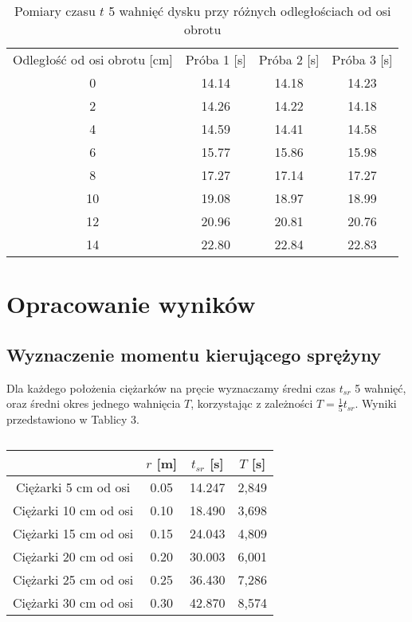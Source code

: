 \documentclass[10pt,a4paper]{article}
\newcommand{\forceindent}{\leavevmode{\parindent=3em\indent}}
\begin{document}
\begin{table}[!h]
\centering
\begin{tabular}{|c||c|c|c|}
\hline
Odległość od osi obrotu [cm]& Próba 1 [s] & Próba 2 [s] & Próba 3 [s] \\
\hhline{|=||=|=|=|}
0 & 14.14 & 14.18 & 14.23 \\
2 & 14.26 & 14.22 & 14.18 \\ 
4 & 14.59 & 14.41 & 14.58 \\
6 & 15.77 & 15.86 & 15.98 \\
8 & 17.27 & 17.14 & 17.27 \\
10 & 19.08 & 18.97 & 18.99 \\
12 & 20.96 & 20.81 & 20.76 \\
14 & 22.80 & 22.84 & 22.83 \\
\hline

\end{tabular}
\caption{Pomiary czasu $t$ 5 wahnięć dysku przy różnych odległościach od osi obrotu}
\end{table}
\vspace{10pt}
\newpage
\section{Opracowanie wyników}
\subsection{Wyznaczenie momentu kierującego sprężyny}

\forceindent Dla każdego położenia ciężarków na pręcie wyznaczamy średni czas $t_{sr}$ 5 wahnięć, oraz średni okres jednego wahnięcia $T$, korzystając z zależności $T = \frac{1}{5}t_{sr}$. Wyniki przedstawiono w Tablicy 3.\\ 
\begin{table}[!h]
\centering
\begin{tabular}{|c||c|c|c|}
\hline

 & $r$ [m] & $t_{sr}$ [s] & $T$ [s] \\
\hline	
\hline
Ciężarki 5 cm od osi & 0.05 & 14.247 & 2,849\\ \hline
Ciężarki 10 cm od osi&  0.10 & 18.490 & 3,698 \\ \hline
Ciężarki 15 cm od osi&0.15 & 24.043 &4,809 \\ \hline
Ciężarki 20 cm od osi&0.20 & 30.003 &6,001 \\ \hline
Ciężarki 25 cm od osi&0.25 & 36.430 & 7,286 \\ \hline
Ciężarki 30 cm od osi&0.30 &  42.870 & 8,574 \\ \hline
\hline

\end{tabular}
\caption{}
\end{table}
\end{document}
